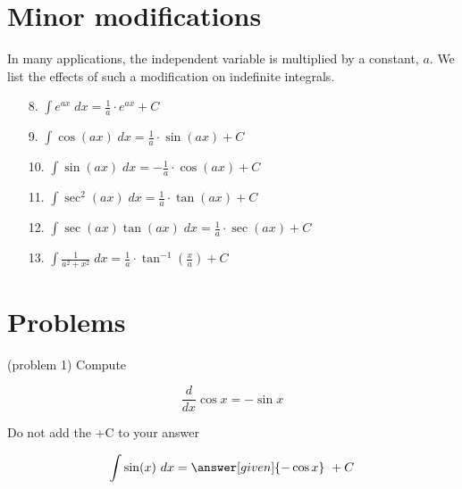 \documentclass[handout]{ximera}
\begin{document}
\section{Minor modifications}

In many applications, the independent variable is multiplied by a constant, $a$. 
We list the effects of such a modification on indefinite integrals.

\begin{enumerate}

\item[8.] $\displaystyle{\int e^{ax} \; dx = \frac{1}{a} \cdot e^{ax} + C}$


\item[9.] $\displaystyle{\int \cos(ax) \; dx = \frac{1}{a} \cdot \sin(ax) + C}$

\item[10.] $\displaystyle{\int \sin(ax) \; dx = -\frac{1}{a} \cdot \cos(ax) + C}$

\item[11.] $\displaystyle{\int \sec^2(ax) \; dx = \frac{1}{a} \cdot \tan(ax) + C}$

\item[12.] $\displaystyle{\int \sec(ax)\tan(ax) \; dx = \frac{1}{a} \cdot \sec(ax) + C}$

\item[13.] $\displaystyle{\int \frac{1}{a^2 + x^2} \; dx = \frac{1}{a} \cdot \tan^{-1}\left(\frac{x}{a}\right) + C}$

\end{enumerate}



\section{Problems}






\begin{problem}(problem 1)
Compute
\begin{hint}
\[
\frac{d}{dx} \cos x = -\sin x
\]
\end{hint}
\begin{hint}
\begin{center}
Do not add the +C to your answer
\end{center}
\end{hint}

\[
\int \sin(x) \ dx =
\answer[given]{-\cos x} \ + C
\]
\end{problem}
\end{document}
